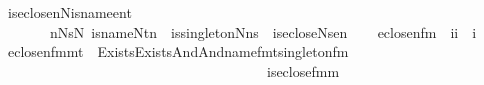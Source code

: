 \begin{isabellebody}
\ \ {\isachardoublequoteopen}is{\isacharunderscore}{\kern0pt}eclose{\isacharunderscore}{\kern0pt}n{\isacharparenleft}{\kern0pt}N{\isacharcomma}{\kern0pt}is{\isacharunderscore}{\kern0pt}name{\isacharcomma}{\kern0pt}en{\isacharcomma}{\kern0pt}t{\isacharparenright}{\kern0pt}\ {\isasymequiv}\ \isanewline
\ \ \ \ \ \ \ \ {\isasymexists}n{}{\isacharbrackleft}{\kern0pt}N{\isacharbrackright}{\kern0pt}{\isachardot}{\kern0pt}{\isasymexists}s{}{\isacharbrackleft}{\kern0pt}N{\isacharbrackright}{\kern0pt}{\isachardot}{\kern0pt}\ is{\isacharunderscore}{\kern0pt}name{\isacharparenleft}{\kern0pt}N{\isacharcomma}{\kern0pt}t{\isacharcomma}{\kern0pt}n{}{\isacharparenright}{\kern0pt}\ {\isasymand}\ is{\isacharunderscore}{\kern0pt}singleton{\isacharparenleft}{\kern0pt}N{\isacharcomma}{\kern0pt}n{}{\isacharcomma}{\kern0pt}s{}{\isacharparenright}{\kern0pt}\ {\isasymand}\ is{\isacharunderscore}{\kern0pt}eclose{\isacharparenleft}{\kern0pt}N{\isacharcomma}{\kern0pt}s{}{\isacharcomma}{\kern0pt}en{\isacharparenright}{\kern0pt}{\isachardoublequoteclose}\isanewline
\isanewline
{}\isamarkupfalse%
\ \isanewline
\ \ eclose{\isacharunderscore}{\kern0pt}n{}{\isacharunderscore}{\kern0pt}fm\ {\isacharcolon}{\kern0pt}{\isacharcolon}{\kern0pt}\ {\isachardoublequoteopen}{\isacharbrackleft}{\kern0pt}i{\isacharcomma}{\kern0pt}i{\isacharbrackright}{\kern0pt}\ {\isasymRightarrow}\ i{\isachardoublequoteclose}\ \isanewline
\ \ {\isachardoublequoteopen}eclose{\isacharunderscore}{\kern0pt}n{}{\isacharunderscore}{\kern0pt}fm{\isacharparenleft}{\kern0pt}m{\isacharcomma}{\kern0pt}t{\isacharparenright}{\kern0pt}\ {\isasymequiv}\ Exists{\isacharparenleft}{\kern0pt}Exists{\isacharparenleft}{\kern0pt}And{\isacharparenleft}{\kern0pt}And{\isacharparenleft}{\kern0pt}name{}{\isacharunderscore}{\kern0pt}fm{\isacharparenleft}{\kern0pt}t{\isacharhash}{\kern0pt}{\isacharplus}{\kern0pt}{}{\isacharcomma}{\kern0pt}{}{\isacharparenright}{\kern0pt}{\isacharcomma}{\kern0pt}singleton{\isacharunderscore}{\kern0pt}fm{\isacharparenleft}{\kern0pt}{}{\isacharcomma}{\kern0pt}{}{\isacharparenright}{\kern0pt}{\isacharparenright}{\kern0pt}{\isacharcomma}{\kern0pt}\isanewline
\ \ \ \ \ \ \ \ \ \ \ \ \ \ \ \ \ \ \ \ \ \ \ \ \ \ \ \ \ \ \ \ \ \ \ \ \ \ \ is{\isacharunderscore}{\kern0pt}eclose{\isacharunderscore}{\kern0pt}fm{\isacharparenleft}{\kern0pt}{}{\isacharcomma}{\kern0pt}m{\isacharhash}{\kern0pt}{\isacharplus}{\kern0pt}{}{\isacharparenright}{\kern0pt}{\isacharparenright}{\kern0pt}{\isacharparenright}{\kern0pt}{\isacharparenright}{\kern0pt}{\isachardoublequoteclose}\isanewline

\end{isabellebody}
